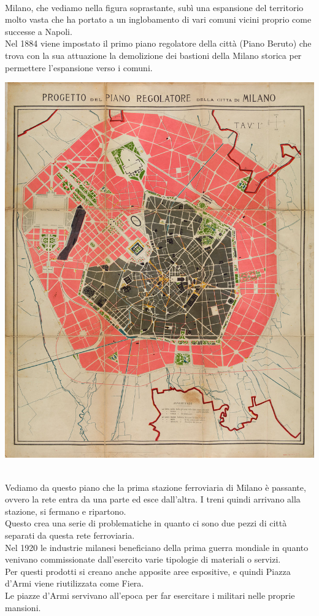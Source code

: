 \documentclass[a4paper,12pt, oneside]{book}
\begin{document}
  \leavevmode\\
  Milano, che vediamo nella figura soprastante, subì una espansione del territorio molto vasta che ha portato a un inglobamento di vari comuni vicini proprio come successe a Napoli.\\
  Nel 1884 viene impostato il primo piano regolatore della città (Piano Beruto) che trova con la sua attuazione la demolizione dei bastioni della Milano storica per permettere l'espansione verso i comuni.\\
  \begin{center}
  	\includegraphics[width=0.6\linewidth]{"immagini/Milano_-_Piano_Beruto_(bozza)"}
  	\label{fig:Milano Piano Beruto}
  \end{center}
  \leavevmode\\
  Vediamo da questo piano che la prima stazione ferroviaria di Milano è passante, ovvero la rete entra da una parte ed esce dall'altra. I treni quindi arrivano alla stazione, si fermano e ripartono.\\
  Questo crea una serie di problematiche in quanto ci sono due pezzi di città separati da questa rete ferroviaria.\\
  Nel 1920 le industrie milanesi beneficiano della prima guerra mondiale in quanto venivano commissionate dall'esercito varie tipologie di materiali o servizi.\\ Per questi prodotti si creano anche apposite aree espositive, e quindi Piazza d'Armi viene riutilizzata come Fiera.\\
  Le piazze d'Armi servivano all'epoca per far esercitare i militari nelle proprie mansioni.\\
\end{document}
